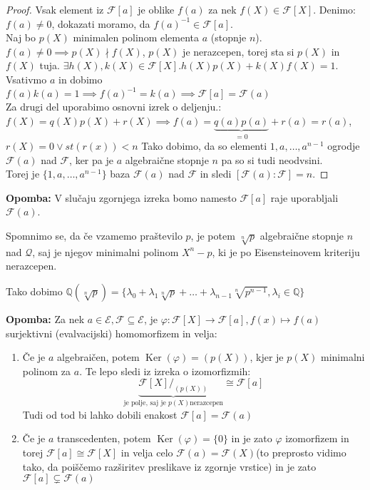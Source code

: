 \documentclass[a4paper]{article}
\newcounter{environment:definition_counter}
\newcounter{environment:theorem_counter}
\newcounter{environment:statement_counter}
\newenvironment{remark}
{\textbf{Opomba:}}
{}
\renewcommand{\ker}{\ensuremath{\operatorname{Ker}}} %
\begin{document}
\begin{proof}
Vsak element iz $\mathcal{F}[a]$ je oblike $f(a)$ za nek $f(X) \in \mathcal{F}[X]$. Denimo: $f(a) \neq 0$, dokazati moramo, da $f(a)^{-1} \in \mathcal{F}[a]$.\\
Naj bo $p(X)$ minimalen polinom elementa $a$ (stopnje $n$). $f(a) \neq 0 \implies p(X) \nmid f(X)$, $p(X)$ je nerazcepen, torej sta si $p(X)$ in $f(X)$ tuja. $\exists h(X), k(X) \in \mathcal{F}[X]. h(X) p(X) + k(X)f(X) = 1$. Vsativmo $a$ in dobimo $f(a)k(a) = 1 \implies f(a)^{-1} = k(a) \implies \mathcal{F}[a] = \mathcal{F}(a)$\\
Za drugi del uporabimo osnovni izrek o deljenju.:
$f(X) = q(X)p(X) + r(X) \implies f(a) = \underbrace{q(a)p(a)}_{=0} + r(a) = r(a)$, $r(X) = 0 \lor st(r(x)) < n$
Tako dobimo, da so elementi $1, a, \dots , a^{n-1}$ ogrodje $\mathcal{F}(a)$ nad $\mathcal{F}$, ker pa je $a$ algebraične stopnje $n$ pa so si tudi neodvsini.\\
Torej je $\{1, a, \dots, a^{n-1} \}$ baza $\mathcal{F}(a)$ nad $\mathcal{F}$ in sledi $[\mathcal{F}(a):\mathcal{F}] = n$.
\end{proof}

\begin{remark}
V slučaju zgornjega izreka bomo namesto $\mathcal{F}[a]$ raje uporabljali $\mathcal{F}(a)$.
\end{remark}

Spomnimo se, da če vzamemo praštevilo $p$, je potem $\sqrt[n]{p}$ algebraične stopnje $n$ nad $\mathcal{Q}$, saj je njegov minimalni polinom $X^n - p$, ki je po Eisensteinovem kriteriju nerazcepen.

Tako dobimo $\mathbb{Q}(\sqrt[n]{p}) = \{ \lambda_0 + \lambda_1 \sqrt[n]{p} + \dots  + \lambda_{n-1}\sqrt[n]{p^{n-1}}, \lambda_i \in \mathbb{Q} \}$


\begin{remark}
Za nek $a \in \mathcal{E}, \mathcal{F} \subseteq \mathcal{E}$, je $\varphi : \mathcal{F}[X] \to \mathcal{F}[a], f(x) \mapsto f(a)$ surjektivni (evalvacijski) homomorfizem in velja:
\begin{enumerate}
\item Če je $a$ algebraičen, potem $\ker(\varphi) = (p(X))$, kjer je $p(X)$ minimalni polinom za $a$. Te lepo sledi iz izreka o izomorfizmih: 
$$\underbrace{\mathcal{F}[X]/_{(p(X))}}_{\text{je polje, saj je } p(X) \text{nerazcepen}} \cong \mathcal{F}[a]$$
Tudi od tod bi lahko dobili enakost $\mathcal{F}[a] = \mathcal{F}(a)$
\item Če je $a$ transcedenten, potem $\ker(\varphi) = \{0\}$ in je zato $\varphi$ izomorfizem in torej $\mathcal{F}[a] \cong \mathcal{F}[X]$ in velja celo $\mathcal{F}(a) = \mathcal{F}(X)$(to preprosto vidimo tako, da poiščemo razširitev preslikave iz zgornje vrstice) in je zato $\mathcal{F}[a] \subsetneq \mathcal{F}(a)$
\end{enumerate}
\end{remark}
\end{document}
